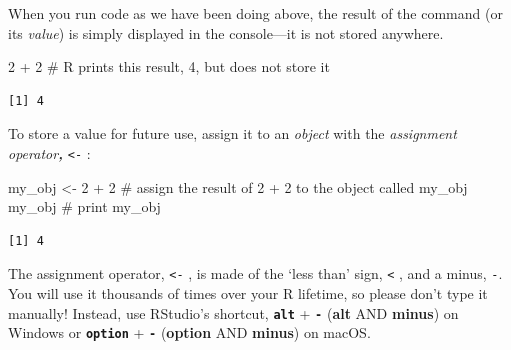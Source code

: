 \documentclass[
  letterpaper,
  DIV=11,
  numbers=noendperiod]{scrreprt}
\newenvironment{Shaded}{\begin{snugshade}}{\end{snugshade}}
\newcommand{\CommentTok}[1]{\textcolor[rgb]{0.37,0.37,0.37}{#1}}
\newcommand{\DecValTok}[1]{\textcolor[rgb]{0.68,0.00,0.00}{#1}}
\newcommand{\NormalTok}[1]{\textcolor[rgb]{0.00,0.23,0.31}{#1}}
\newcommand{\OtherTok}[1]{\textcolor[rgb]{0.00,0.23,0.31}{#1}}
\newcommand{\SpecialCharTok}[1]{\textcolor[rgb]{0.37,0.37,0.37}{#1}}
\begin{document}
When you run code as we have been doing above, the result of the command
(or its \emph{value}) is simply displayed in the console---it is not
stored anywhere.

\begin{Shaded}
\begin{Highlighting}[]
\DecValTok{2} \SpecialCharTok{+} \DecValTok{2} \CommentTok{\# R prints this result, 4, but does not store it }
\end{Highlighting}
\end{Shaded}

\begin{verbatim}
[1] 4
\end{verbatim}

To store a value for future use, assign it to an \emph{object} with the
\emph{assignment operator\textbf{,}} \texttt{\textless{}-} :

\begin{Shaded}
\begin{Highlighting}[]
\NormalTok{my\_obj }\OtherTok{\textless{}{-}} \DecValTok{2} \SpecialCharTok{+} \DecValTok{2} \CommentTok{\# assign the result of \textasciigrave{}2 + 2 \textasciigrave{} to the object called \textasciigrave{}my\_obj\textasciigrave{}}
\NormalTok{my\_obj }\CommentTok{\# print my\_obj}
\end{Highlighting}
\end{Shaded}

\begin{verbatim}
[1] 4
\end{verbatim}

The assignment operator, \texttt{\textless{}-} , is made of the `less
than' sign, \texttt{\textless{}} , and a minus, \texttt{-}. You will use
it thousands of times over your R lifetime, so please don't type it
manually! Instead, use RStudio's shortcut, \textbf{\texttt{alt}} +
\textbf{\texttt{-}} (\textbf{alt} AND \textbf{minus}) on Windows or
\textbf{\texttt{option}} + \textbf{\texttt{-}} (\textbf{option} AND
\textbf{minus}) on macOS.
\end{document}

